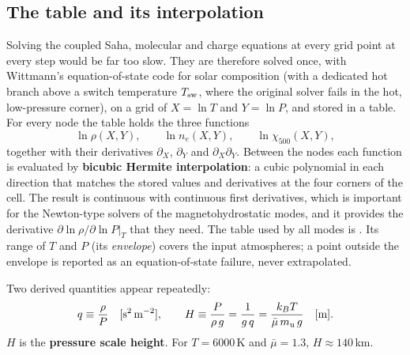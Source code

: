 \subsection{The table and its interpolation}
Solving the coupled Saha, molecular and charge equations at every grid point at every step would be far too slow. They
are therefore solved once, with Wittmann's equation-of-state code for solar composition (with a dedicated hot branch above
a switch temperature $T_{\rm sw}$, where the original solver fails in the hot, low-pressure corner), on a grid of
$X=\ln T$ and $Y=\ln P$, and stored in a table. For every node the table holds the three functions
\[
\ln\rho(X,Y),\qquad \ln n_e(X,Y),\qquad \ln\chi_{500}(X,Y),
\]
together with their derivatives $\partial_X$, $\partial_Y$ and $\partial_X\partial_Y$. Between the nodes each function is
evaluated by \textbf{bicubic Hermite interpolation}: a cubic polynomial in each direction that matches the stored values
and derivatives at the four corners of the cell. The result is continuous with continuous first derivatives, which is
important for the Newton-type solvers of the magnetohydrostatic modes, and it provides the derivative
$\partial\ln\rho/\partial\ln P|_T$ that they need. The table used by all modes is .
Its range of $T$ and $P$ (its \emph{envelope}) covers the input atmospheres; a point outside the envelope is reported as
an equation-of-state failure, never extrapolated.

Two derived quantities appear repeatedly:
\begin{equation}
q\equiv\frac{\rho}{P}\quad[{\rm s^2\,m^{-2}}],\qquad H\equiv\frac{P}{\rho\,g}=\frac{1}{g\,q}=\frac{k_BT}{\bar\mu\,m_{\rm u}\,g}\quad[{\rm m}].
\label{eq:H}
\end{equation}
$H$ is the \textbf{pressure scale height}. For $T=6000$\,K and $\bar\mu=1.3$, $H\approx140$\,km.
